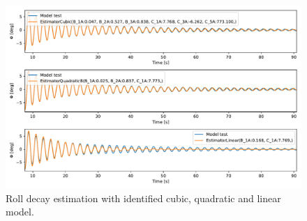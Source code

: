 \begin{figure}[!htb]
    \centering
    \includegraphics[width=\linewidth]{kappa/images/roll_decay_model_compare.pdf}
    \caption{Roll decay estimation with identified cubic, quadratic and linear model.}
    \label{fig:roll_decay_compare}
\end{figure}

